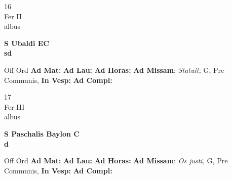 \documentclass[10pt, openany]{book}
\begin{document}
        \begin{center}
            \begin{minipage}{3.5in}
                \vspace{2em}
                \begin{minipage}{0.5in}
                    {\Huge 16} \\
                    {\normalsize Fer II} \\
                    {\normalsize albus}
                \end{minipage}
                \begin{minipage}{3.0in}
                    \textbf{ \large S Ubaldi EC \\
                    \textnormal{\normalsize sd}} \\ 
                \end{minipage}
                \begin{justify}Off Ord
                    \textbf{Ad Mat: }
                    \textbf{Ad Lau: }
                    \textbf{Ad Horas: }\textbf{Ad Missam}: \textit{Statuit,} G, Pre Communis,  
                    \textbf{In Vesp: }
                    \textbf{Ad Compl: }
                \end{justify}
            \end{minipage}
        \end{center}
    
        \begin{center}
            \begin{minipage}{3.5in}
                \vspace{2em}
                \begin{minipage}{0.5in}
                    {\Huge 17} \\
                    {\normalsize Fer III} \\
                    {\normalsize albus}
                \end{minipage}
                \begin{minipage}{3.0in}
                    \textbf{ \large S Paschalis Baylon C \\
                    \textnormal{\normalsize d}} \\ 
                \end{minipage}
                \begin{justify}Off Ord
                    \textbf{Ad Mat: }
                    \textbf{Ad Lau: }
                    \textbf{Ad Horas: }\textbf{Ad Missam}: \textit{Os justi,} G, Pre Communis,  
                    \textbf{In Vesp: }
                    \textbf{Ad Compl: }
                \end{justify}
            \end{minipage}
        \end{center}
    
\end{document}
